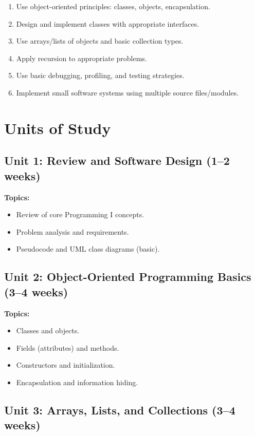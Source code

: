 \documentclass[12pt,oneside]{book}
\begin{document}
\begin{enumerate}
    \item Use object-oriented principles: classes, objects, encapsulation.
    \item Design and implement classes with appropriate interfaces.
    \item Use arrays/lists of objects and basic collection types.
    \item Apply recursion to appropriate problems.
    \item Use basic debugging, profiling, and testing strategies.
    \item Implement small software systems using multiple source files/modules.
\end{enumerate}

\section{Units of Study}

\subsection{Unit 1: Review and Software Design (1--2 weeks)}

\textbf{Topics:}
\begin{itemize}
    \item Review of core Programming I concepts.
    \item Problem analysis and requirements.
    \item Pseudocode and UML class diagrams (basic).
\end{itemize}

\subsection{Unit 2: Object-Oriented Programming Basics (3--4 weeks)}

\textbf{Topics:}
\begin{itemize}
    \item Classes and objects.
    \item Fields (attributes) and methods.
    \item Constructors and initialization.
    \item Encapsulation and information hiding.
\end{itemize}

\subsection{Unit 3: Arrays, Lists, and Collections (3--4 weeks)}
\end{document}
